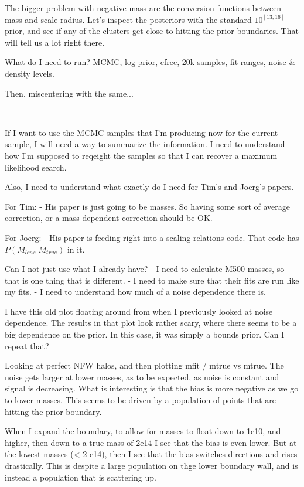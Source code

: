 \documentclass[11pt]{article}
\begin{document}
The bigger problem with negative mass are the conversion functions between mass and scale radius. Let's inspect the posteriors with the standard $10^{[13,16]}$ prior, and see if any of the clusters get close to hitting the prior boundaries. That will tell us a lot right there.

What do I need to run? MCMC, log prior, cfree, 20k samples, fit ranges, noise \& density levels.

Then, miscentering with the same...


------


If I want to use the MCMC samples that I'm producing now for the current sample, I will need a way to summarize the information. I need to understand how I'm supposed to reqeight the samples so that I can recover a maximum likelihood  search.

Also, I need to understand what exactly do I need for Tim's and Joerg's papers. 

For Tim:
  - His paper is just going to be masses. So having some sort of average correction, or a mass dependent correction should be OK.

For Joerg:
  - His paper is feeding right into a scaling relations code. That code has $P(M_{lens} | M_{true})$ in it. 


Can I not just use what I already have?
  - I need to calculate M500 masses, so that is one thing that is different.
  - I need to make sure that their fits are run like my fits.
  - I need to understand how much of a noise dependence there is.

I have this old plot floating around from when I previously looked at noise dependence.
The results in that plot look rather scary, where there seems to be a big dependence on the prior.
In this case, it was simply a bounds prior.
Can I repeat that?




Looking at perfect NFW halos, and then plotting mfit / mtrue vs mtrue. The noise gets larger at lower masses, as to be expected, as noise is constant and signal is decreasing.
What is interesting is that the bias is more negative as we go to lower masses. 
This seems to be driven by a population of points that are hitting the prior boundary.

When I expand the boundary, to allow for masses to float down to 1e10, and higher, then down to a true mass of 2e14 I see that the bias is even lower. But at the lowest masses (< 2 e14), then I see that the bias switches directions and rises drastically.
This is despite a large population on thge lower boundary wall, and is instead a population that is scattering up.
\end{document}

